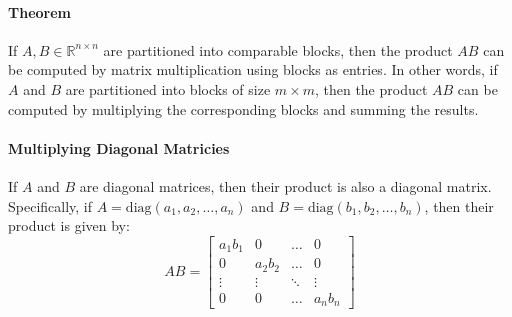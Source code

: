 \paragraph*{Theorem}
If $A, B \in \mathbb{R}^{n \times n}$ are partitioned into comparable blocks, then the product $AB$ can be computed by matrix multiplication
using blocks as entries. In other words, if $A$ and $B$ are partitioned into blocks of size $m \times m$, then the product $AB$ can be computed by multiplying the corresponding blocks and summing the results.

\paragraph*{Multiplying Diagonal Matricies}
If $A$ and $B$ are diagonal matrices, then their product is also a diagonal matrix. Specifically, if $A = \text{diag}(a_1, a_2, \ldots, a_n)$ and $B = \text{diag}(b_1, b_2, \ldots, b_n)$, then their product is given by:
\[AB = \begin{bmatrix}
    a_1 b_1 & 0 & \ldots & 0 \\
    0 & a_2 b_2 & \ldots & 0 \\
    \vdots & \vdots & \ddots & \vdots \\
    0 & 0 & \ldots & a_n b_n
\end{bmatrix}\]
